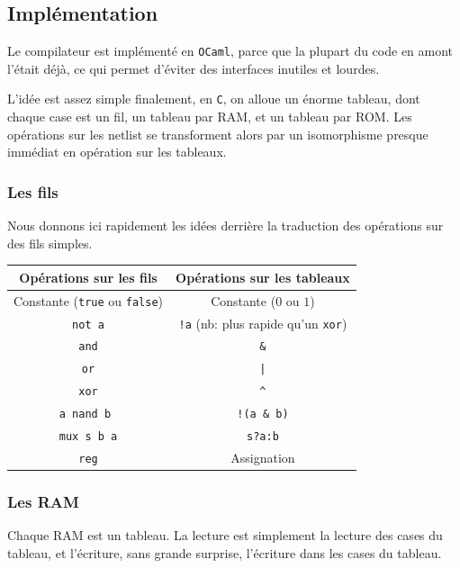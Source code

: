 \documentclass[10pt,a4paper,notitlepage ]{article}
\begin{document}
	\subsection{Implémentation}
	
	Le compilateur est implémenté en \texttt{OCaml}, parce que la plupart du code en amont l'était déjà, ce qui permet d'éviter des interfaces inutiles et lourdes.
	
	L'idée est assez simple finalement, en \texttt{C}, on alloue un énorme tableau, dont chaque case est un fil, un tableau par RAM, et un tableau par ROM. Les opérations sur les netlist se transforment alors par un isomorphisme presque immédiat en opération sur les tableaux.
	
	\subsubsection{Les fils}
	
	Nous donnons ici rapidement les idées derrière la traduction des opérations sur des fils simples.
	
	\begin{center}
		
	\begin{tabular}{|c|c|}
		\hline
		Opérations sur les fils & Opérations sur les tableaux \\
		\hline
		Constante (\texttt{true} ou \texttt{false})& Constante ($0$ ou $1$)  \\
		\hline
		\texttt{not a}& \texttt{!a}  (nb: plus rapide qu'un \texttt{xor})\\
		\hline
		\texttt{and} & \texttt{\&}  \\
		\hline
		\texttt{or}& \texttt{|} \\
		\hline
		\texttt{xor}& \texttt{\^} \\
		\hline
		\texttt{a nand b }& \texttt{!(a \& b)} \\
		\hline
		\texttt{mux s b a}& \texttt{s?a:b} \\
		\hline
		\texttt{reg}&Assignation\\
		\hline
	\end{tabular}
	
	\end{center}

	\subsubsection{Les RAM}
	
	Chaque RAM est un tableau. La lecture est simplement la lecture des cases du tableau, et l'écriture, sans grande surprise, l'écriture dans les cases du tableau.
	
\end{document}
